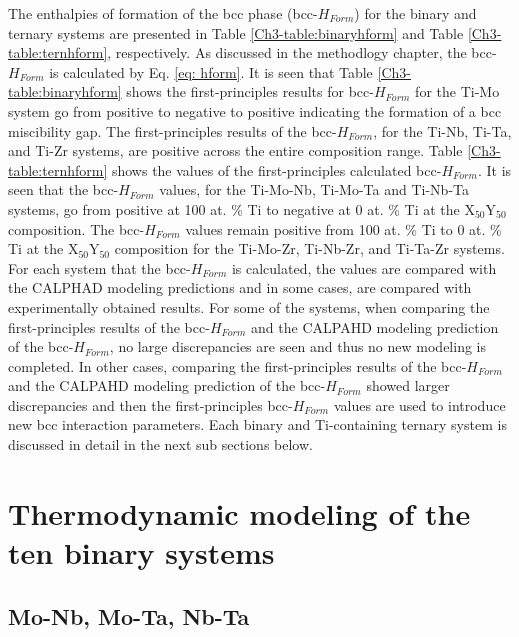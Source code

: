The enthalpies of formation of the bcc phase (bcc-$H_{Form}$) for the binary and ternary systems are presented in Table \ref{Ch3-table:binaryhform} and Table \ref{Ch3-table:ternhform}, respectively. As discussed in the methodlogy chapter, the bcc-$H_{Form}$ is calculated by Eq. \ref{eq: hform}. It is seen that Table \ref{Ch3-table:binaryhform} shows the first-principles results for bcc-$H_{Form}$ for the Ti-Mo system go from positive to negative to positive indicating the formation of a bcc miscibility gap. The first-principles results of the bcc-$H_{Form}$, for the Ti-Nb, Ti-Ta, and Ti-Zr systems, are positive across the entire composition range. Table \ref{Ch3-table:ternhform} shows the values of the first-principles calculated bcc-$H_{Form}$.  It is seen that the bcc-$H_{Form}$ values, for the Ti-Mo-Nb, Ti-Mo-Ta and Ti-Nb-Ta systems, go from positive at 100 at. \% Ti to negative at 0 at. \% Ti at the X$_{50}$Y$_{50}$ composition. The bcc-$H_{Form}$ values remain positive from 100 at. \% Ti to 0 at. \% Ti at the X$_{50}$Y$_{50}$ composition for the Ti-Mo-Zr, Ti-Nb-Zr, and Ti-Ta-Zr systems. For each system that the bcc-$H_{Form}$ is calculated, the values are compared with the CALPHAD modeling predictions and in some cases, are compared with experimentally obtained results. For some of the systems, when comparing the first-principles results of the bcc-$H_{Form}$ and the CALPAHD modeling prediction of the bcc-$H_{Form}$, no large discrepancies are seen and thus no new modeling is completed. In other cases, comparing the first-principles results of the bcc-$H_{Form}$ and the CALPAHD modeling prediction of the bcc-$H_{Form}$ showed larger discrepancies and then the first-principles bcc-$H_{Form}$ values are used to introduce new bcc interaction parameters. Each binary and Ti-containing ternary system is discussed in detail in the next sub sections below.

\section{Thermodynamic modeling of the ten binary systems}

\subsection{Mo-Nb, Mo-Ta, Nb-Ta}


